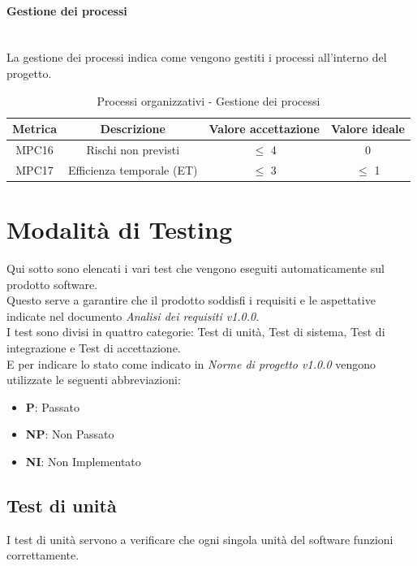 \documentclass[10pt]{article}
\begin{document}
\begin{justify}
\paragraph{Gestione dei processi}\mbox{}\\
La gestione dei processi indica come vengono gestiti i processi all'interno del progetto.\\
\begin{table}[H]
  \centering
\begin{tabular}{|c|c|c|c|}
  \hline
  \textbf{Metrica} & \textbf{Descrizione} & \textbf{Valore accettazione} & \textbf{Valore ideale}\\
  \hline
  MPC16 & Rischi non previsti & $\leq$ 4 & 0 \\
  \hline
  MPC17 & Efficienza temporale (ET) & $\leq$ 3 & $\leq$ 1 \\
  \hline
\end{tabular}
\caption{Processi organizzativi - Gestione dei processi}
\label{tab:gestione dei processi}
\end{table}
\newpage

\section{Modalità di Testing}
Qui sotto sono elencati i vari test che vengono eseguiti automaticamente sul prodotto software.\\
Questo serve a garantire che il prodotto soddisfi i requisiti e le aspettative indicate nel documento \textit{Analisi dei requisiti v1.0.0}.\\
I test sono divisi in quattro categorie: Test di unità, Test di sistema, Test di integrazione e Test di accettazione.\\
E per indicare lo stato come indicato in \textit{Norme di progetto v1.0.0} vengono utilizzate le seguenti abbreviazioni:
\begin{itemize}
\item \textbf{P}: Passato
\item \textbf{NP}: Non Passato
\item \textbf{NI}: Non Implementato
\end{itemize}

\subsection{Test di unità}
I test di unità servono a verificare che ogni singola unità del software funzioni correttamente.\\


\end{justify}
\end{document}
